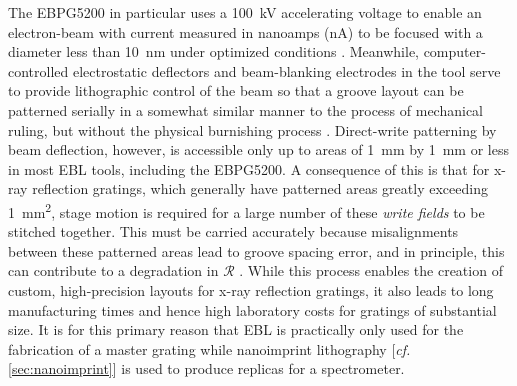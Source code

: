 The \textsc{EBPG5200} in particular uses a \SI{100}{\kilo\volt} accelerating voltage to enable an electron-beam with current measured in nanoamps (\si{\nano\ampere}) to be focused with a diameter less than \SI{10}{\nm} under optimized conditions \cite{PSU_MRI_EBL}. 
Meanwhile, computer-controlled electrostatic deflectors and beam-blanking electrodes in the tool serve to provide lithographic control of the beam so that a groove layout can be patterned serially in a somewhat similar manner to the process of mechanical ruling, but without the physical burnishing process \cite{Chen15,Mohammad2012,Wu10}. 
Direct-write patterning by beam deflection, however, is accessible only up to areas of \SI{1}{\mm} by \SI{1}{\mm} or less in most EBL tools, including the \textsc{EBPG5200}. 
A consequence of this is that for x-ray reflection gratings, which generally have patterned areas greatly exceeding \SI{1}{\mm\squared}, stage motion is required for a large number of these \emph{write fields} to be stitched together. 
This must be carried accurately because misalignments between these patterned areas lead to groove spacing error, and in principle, this can contribute to a degradation in $\mathscr{R}$ \cite{Dougherty01,DeRoo20b}. 
While this process enables the creation of custom, high-precision layouts for x-ray reflection gratings, it also leads to long manufacturing times and hence high laboratory costs for gratings of substantial size. 
It is for this primary reason that EBL is practically only used for the fabrication of a master grating while nanoimprint lithography [\emph{cf.\@} \cref{sec:nanoimprint}] is used to produce replicas for a spectrometer. 

